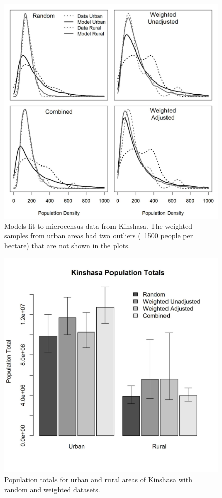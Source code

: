\documentclass[9pt,twocolumn,twoside,lineno]{pnas-new}
\begin{document}
\begin{figure}
	\centering
	\includegraphics[width=1\linewidth]{figs/drc_model.jpg}
	\caption{Models fit to microcensus data from Kinshasa. The weighted samples from urban areas had two outliers (~1500 people per hectare) that are not shown in the plots.}
	\label{fig:drc_model}
\end{figure}

\begin{figure}
	\centering
	\includegraphics[width=1\linewidth]{figs/drc_totals.jpg}
	\caption{Population totals for urban and rural areas of Kinshasa with random and weighted datasets.}
	\label{fig:drc_totals}
\end{figure}
\end{document}
